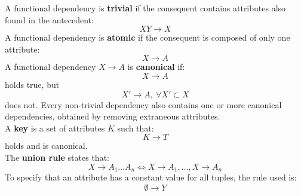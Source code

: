 A functional dependency is \textbf{trivial} if the consequent contains attributes also found in the antecedent:
\begin{equation*}
    XY \rightarrow X
\end{equation*}
A functional dependency is \textbf{atomic} if the consequent is composed of only one attribute:
\begin{equation*}
    X \rightarrow A
\end{equation*}
A functional dependency $X \rightarrow A$ is \textbf{canonical} if:
\begin{equation*}
    X \rightarrow A
\end{equation*}
holds true, but
\begin{equation*}
    X' \rightarrow A, \ \forall X' \subset X
\end{equation*}
does not. Every non-trivial dependency also contains one or more canonical dependencies, obtained by removing extraneous attributes. \\
A \textbf{key} is a set of attributes $K$ such that:
\begin{equation*}
    K \rightarrow T
\end{equation*}
holds and is canonical. \\
The \textbf{union rule} states that:
\begin{equation*}
    X \rightarrow A_1 \dots A_n \iff X \rightarrow A_1, \dots, X \rightarrow A_n
\end{equation*}
To specify that an attribute has a constant value for all tuples, the rule used is:
\begin{equation*}
    \emptyset \rightarrow Y
\end{equation*}

